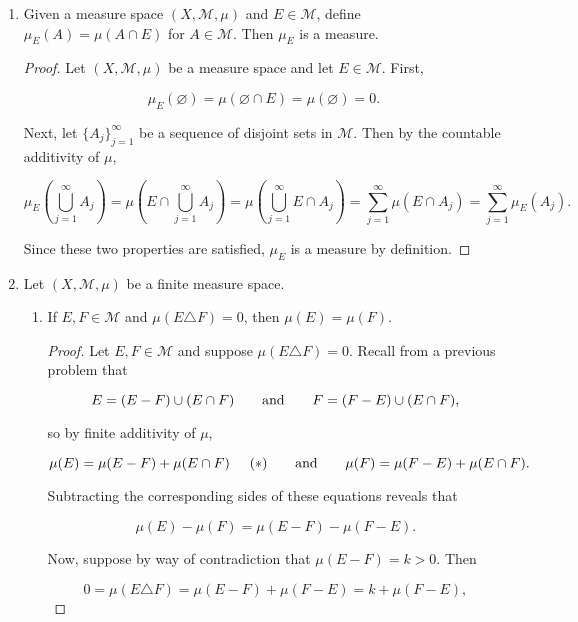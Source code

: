\documentclass[11pt,oneside,english]{amsart}
\theoremstyle{definition}
\newcommand{\aspace}{\hspace{7mm}\text{and}\hspace{7mm}}
\newcommand{\MC}[1]{\mathcal{#1}}
\begin{document}
\begin{enumerate}
\begin{proof}
Adding the corresponding sides of the equations above, we have

\[
\mu(E)+\mu(F)=\mu(E-F)+\mu(E\cap F)+\mu(F-E)+\mu(E\cap F)=\mu(E\cup F)+\mu(E\cap F)
\]
\end{proof}


\item Given a measure space $(X,\MC{M},\mu)$ and $E\in\MC{M}$, define $\mu_E(A)=\mu(A\cap E)$ for $A\in\MC{M}$. Then $\mu_E$ is a measure.

\begin{proof}
Let $(X,\MC{M},\mu)$ be a measure space and let $E\in\MC{M}$. First, 

\[
\mu_E(\varnothing)=\mu(\varnothing\cap E)=\mu(\varnothing)=0.
\]

Next, let $\{A_j\}_{j=1}^\infty$ be a sequence of disjoint sets in $\MC{M}$. Then by the countable additivity of $\mu$,

\[
\mu_E\left(\bigcup_{j=1}^\infty A_j\right)=\mu\left(E\cap\bigcup_{j=1}^\infty A_j\right)=\mu\left(\bigcup_{j=1}^\infty E\cap A_j\right)=\sum_{j=1}^\infty \mu(E\cap A_j)=\sum_{j=1}^\infty\mu_E(A_j).
\]

Since these two properties are satisfied, $\mu_E$ is a measure by definition.
\end{proof}

\setcounter{enumi}{11}

\item Let $(X,\MC{M},\mu)$ be a finite measure space.

\begin{enumerate}
\item If $E,F\in\MC{M}$ and $\mu(E\triangle F)=0$, then $\mu(E)=\mu(F)$. 

\begin{proof}
Let $E,F\in\MC{M}$ and suppose $\mu(E\triangle F)=0$. Recall from a previous problem that

\[
E=(E-F)\cup(E\cap F)\aspace F=(F-E)\cup (E\cap F),
\]

so by finite additivity of $\mu$,

\[
\mu(E)=\mu(E-F)+\mu(E\cap F)\hspace{5mm}(*)\aspace \mu(F)=\mu(F-E)+\mu(E\cap F).
\]

Subtracting the corresponding sides of these equations reveals that

\[
\mu(E)-\mu(F)=\mu(E-F)-\mu(F-E).
\]

Now, suppose by way of contradiction that $\mu(E-F)=k>0$. Then

\[
0=\mu(E\triangle F)=\mu(E-F)+\mu(F-E)=k+\mu(F-E),
\]


\end{proof}
\end{enumerate}
\end{enumerate}
\end{document}
